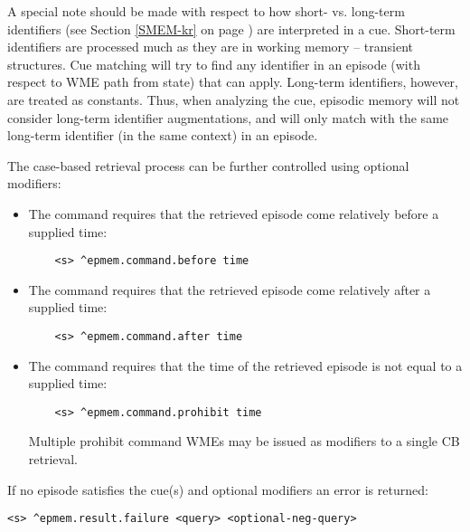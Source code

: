A special note should be made with respect to how short- vs. long-term identifiers (see Section \ref{SMEM-kr} on page \pageref{SMEM-kr}) are interpreted in a cue.
Short-term identifiers are processed much as they are in working memory -- transient structures.
Cue matching will try to find any identifier in an episode (with respect to WME path from state) that can apply.
Long-term identifiers, however, are treated as constants.
Thus, when analyzing the cue, episodic memory will not consider long-term identifier augmentations, and will only match with the same long-term identifier (in the same context) in an episode.

The case-based retrieval process can be further controlled using optional modifiers:

\vspace{-8pt}
\begin{itemize}
\item
	The  command requires that the retrieved episode come relatively before a supplied time:
	\vspace{-6pt}
	\begin{verbatim}
	<s> ^epmem.command.before time
	\end{verbatim}
	\vspace{-6pt}
\item
	The  command requires that the retrieved episode come relatively after a supplied time:
	\vspace{-6pt}
	\begin{verbatim}
	<s> ^epmem.command.after time
	\end{verbatim}
	\vspace{-6pt}
\item
	The  command requires that the time of the retrieved episode is not equal to a supplied time:
	\vspace{-6pt}
	\begin{verbatim}
	<s> ^epmem.command.prohibit time
	\end{verbatim}
	\vspace{-6pt}
	Multiple prohibit command WMEs may be issued as modifiers to a single CB retrieval.
	\vspace{-6pt}
\end{itemize}
\vspace{-12pt}

If no episode satisfies the cue(s) and optional modifiers an error is returned:

\begin{verbatim}
<s> ^epmem.result.failure <query> <optional-neg-query>
\end{verbatim}

